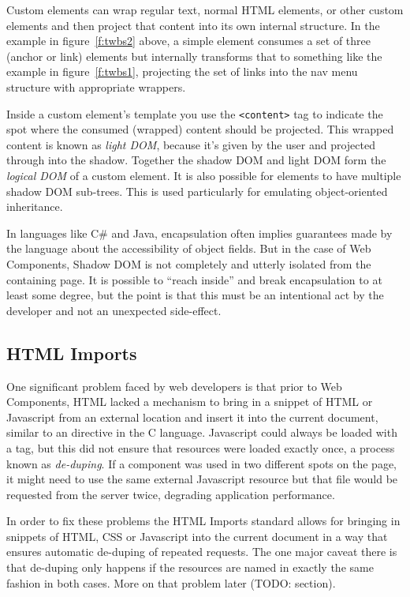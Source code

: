Custom elements can wrap regular text, normal HTML elements, or other custom elements and then project that content into its own internal structure.
In the example in figure~\ref{f:twbs2} above, a simple  element consumes a set of three  (anchor or link) elements
but internally transforms that to something like the example in figure~\ref{f:twbs1}, 
projecting the set of links into the nav menu structure with appropriate wrappers.

Inside a custom element's template you use the \verb|<content>| tag to indicate the spot where the consumed (wrapped) content should be projected. 
This wrapped content is known as \textit{light DOM}, because it's given by the user and projected through into the shadow.
Together the shadow DOM and light DOM form the \textit{logical DOM} of a custom element.
It is also possible for elements to have multiple shadow DOM sub-trees. 
This is used particularly for emulating object-oriented inheritance.

In languages like C\# and Java, encapsulation often implies guarantees made by the language about the accessibility of object fields.
But in the case of Web Components, Shadow DOM is not completely and utterly isolated from the containing page.
It is possible to ``reach inside'' and break encapsulation to at least some degree, 
but the point is that this must be an intentional act by the developer and not an unexpected side-effect.

\subsection{HTML Imports}
One significant problem faced by web developers is that prior to Web Components, HTML lacked a mechanism to bring in a snippet of HTML or Javascript from an external location and insert it into the current document, similar to an  directive in the C language. 
Javascript could always be loaded with a  tag, but this did not ensure that resources were loaded exactly once, a process known as \textit{de-duping}.
If a component was used in two different spots on the page, it might need to use the same external Javascript resource but that file would be requested from the server twice, degrading application performance.

In order to fix these problems the HTML Imports standard allows for bringing in snippets of HTML, CSS or Javascript into the current document in a way that ensures automatic de-duping of repeated requests.
The one major caveat there is that de-duping only happens if the resources are named in exactly the same fashion in both cases.
More on that problem later (TODO: section).

